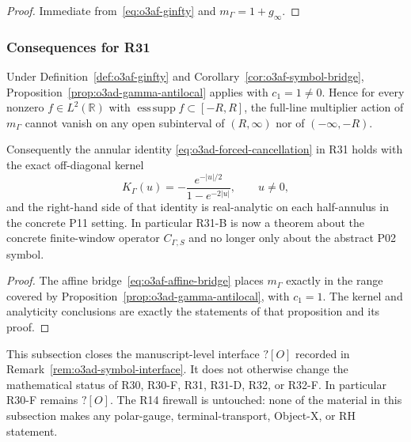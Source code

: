 \begin{proof}
Immediate from~\eqref{eq:o3af-ginfty} and \(m_\Gamma=1+g_\infty\).
\end{proof}

\subsubsection*{Consequences for R31}

\begin{corollary}
\label{cor:o3af-r31-transfer}
Under Definition~\ref{def:o3af-ginfty} and
Corollary~\ref{cor:o3af-symbol-bridge},
Proposition~\ref{prop:o3ad-gamma-antilocal} applies with \(c_1=1\ne0\).
Hence for every nonzero \(f\in L^2(\mathbb R)\) with
\(\operatorname{ess\,supp}f\subset[-R,R]\), the full-line multiplier action of
\(m_\Gamma\) cannot vanish on any open subinterval of \((R,\infty)\) nor of
\((-\infty,-R)\).

Consequently the annular identity
\eqref{eq:o3ad-forced-cancellation} in R31 holds with the exact
off-diagonal kernel
\[
 K_\Gamma(u)=-\frac{e^{-|u|/2}}{1-e^{-2|u|}},\qquad u\ne0,
\]
and the right-hand side of that identity is real-analytic on each
half-annulus in the concrete P11 setting.  In particular R31-B is now a
theorem about the concrete finite-window operator \(C_{\Gamma,S}\) and no
longer only about the abstract P02 symbol.
\end{corollary}

\begin{proof}
The affine bridge~\eqref{eq:o3af-affine-bridge} places \(m_\Gamma\) exactly in
the range covered by
Proposition~\ref{prop:o3ad-gamma-antilocal}, with \(c_1=1\).  The kernel and
analyticity conclusions are exactly the statements of that proposition and its
proof.
\end{proof}

\begin{remark}[Scope]
\label{rem:o3af-scope}
This subsection closes the manuscript-level interface \(?[O]\) recorded in
Remark~\ref{rem:o3ad-symbol-interface}.  It does not otherwise change the
mathematical status of R30, R30-F, R31, R31-D, R32, or R32-F.  In particular
R30-F remains \(?[O]\).  The R14 firewall is untouched: none of the material
in this subsection makes any polar-gauge, terminal-transport, Object-X, or RH
statement.
\end{remark}

